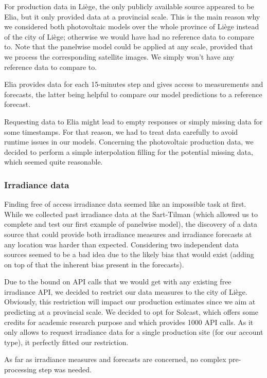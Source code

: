 \documentclass[a4paper, 12pt]{article}
\begin{document}
For production data in Liège, the only publicly available source appeared to be Elia, but it only provided data at a provincial scale. This is the main reason why we considered both photovoltaic models over the whole province of Liège instead of the city of Liège; otherwise we would have had no reference data to compare to. Note that the panelwise model could be applied at any scale, provided that we process the corresponding satellite images. We simply won't have any reference data to compare to.

Elia provides data for each 15-minutes step and gives access to measurements and forecasts, the latter being helpful to compare our model predictions to a reference forecast.

Requesting data to Elia might lead to empty responses or simply missing data for some timestamps. For that reason, we had to treat data carefully to avoid runtime issues in our models. Concerning the photovoltaic production data, we decided to perform a simple interpolation filling for the potential missing data, which seemed quite reasonable.

\subsubsection{Irradiance data}
Finding free of access irradiance data seemed like an impossible task at first. While we collected past irradiance data at the Sart-Tilman (which allowed us to complete and test our first example of panelwise model), the discovery of a data source that could provide both irradiance measures and irradiance forecasts at any location was harder than expected. Considering two independent data sources seemed to be a bad idea due to the likely bias that would exist (adding on top of that the inherent bias present in the forecasts).

Due to the bound on API calls that we would get with any existing free irradiance API, we decided to restrict our data measures to the city of Liège. Obviously, this restriction will impact our production estimates since we aim at predicting at a provincial scale. We decided to opt for Solcast, which offers some credits for academic research purpose and which provides 1000 API calls. As it only allows to request irradiance data for a single production site (for our account type), it perfectly fitted our restriction.

As far as irradiance measures and forecasts are concerned, no complex pre-processing step was needed. 
\end{document}
